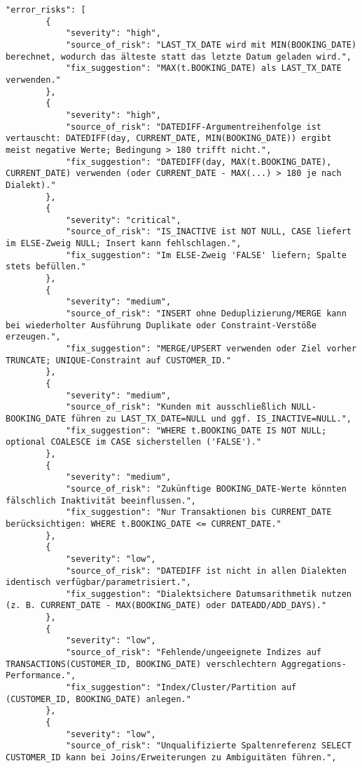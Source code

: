 \begin{lstlisting}[caption={Ausgabe: GPT-5 Anwendungsfall 7 Hauptdurchlauf},label={gpt_case7_prompt1}]
    "error_risks": [
        {
            "severity": "high",
            "source_of_risk": "LAST_TX_DATE wird mit MIN(BOOKING_DATE) berechnet, wodurch das älteste statt das letzte Datum geladen wird.",
            "fix_suggestion": "MAX(t.BOOKING_DATE) als LAST_TX_DATE verwenden."
        },
        {
            "severity": "high",
            "source_of_risk": "DATEDIFF-Argumentreihenfolge ist vertauscht: DATEDIFF(day, CURRENT_DATE, MIN(BOOKING_DATE)) ergibt meist negative Werte; Bedingung > 180 trifft nicht.",
            "fix_suggestion": "DATEDIFF(day, MAX(t.BOOKING_DATE), CURRENT_DATE) verwenden (oder CURRENT_DATE - MAX(...) > 180 je nach Dialekt)."
        },
        {
            "severity": "critical",
            "source_of_risk": "IS_INACTIVE ist NOT NULL, CASE liefert im ELSE-Zweig NULL; Insert kann fehlschlagen.",
            "fix_suggestion": "Im ELSE-Zweig 'FALSE' liefern; Spalte stets befüllen."
        },
        {
            "severity": "medium",
            "source_of_risk": "INSERT ohne Deduplizierung/MERGE kann bei wiederholter Ausführung Duplikate oder Constraint-Verstöße erzeugen.",
            "fix_suggestion": "MERGE/UPSERT verwenden oder Ziel vorher TRUNCATE; UNIQUE-Constraint auf CUSTOMER_ID."
        },
        {
            "severity": "medium",
            "source_of_risk": "Kunden mit ausschließlich NULL-BOOKING_DATE führen zu LAST_TX_DATE=NULL und ggf. IS_INACTIVE=NULL.",
            "fix_suggestion": "WHERE t.BOOKING_DATE IS NOT NULL; optional COALESCE im CASE sicherstellen ('FALSE')."
        },
        {
            "severity": "medium",
            "source_of_risk": "Zukünftige BOOKING_DATE-Werte könnten fälschlich Inaktivität beeinflussen.",
            "fix_suggestion": "Nur Transaktionen bis CURRENT_DATE berücksichtigen: WHERE t.BOOKING_DATE <= CURRENT_DATE."
        },
        {
            "severity": "low",
            "source_of_risk": "DATEDIFF ist nicht in allen Dialekten identisch verfügbar/parametrisiert.",
            "fix_suggestion": "Dialektsichere Datumsarithmetik nutzen (z. B. CURRENT_DATE - MAX(BOOKING_DATE) oder DATEADD/ADD_DAYS)."
        },
        {
            "severity": "low",
            "source_of_risk": "Fehlende/ungeeignete Indizes auf TRANSACTIONS(CUSTOMER_ID, BOOKING_DATE) verschlechtern Aggregations-Performance.",
            "fix_suggestion": "Index/Cluster/Partition auf (CUSTOMER_ID, BOOKING_DATE) anlegen."
        },
        {
            "severity": "low",
            "source_of_risk": "Unqualifizierte Spaltenreferenz SELECT CUSTOMER_ID kann bei Joins/Erweiterungen zu Ambiguitäten führen.",

\end{lstlisting}

